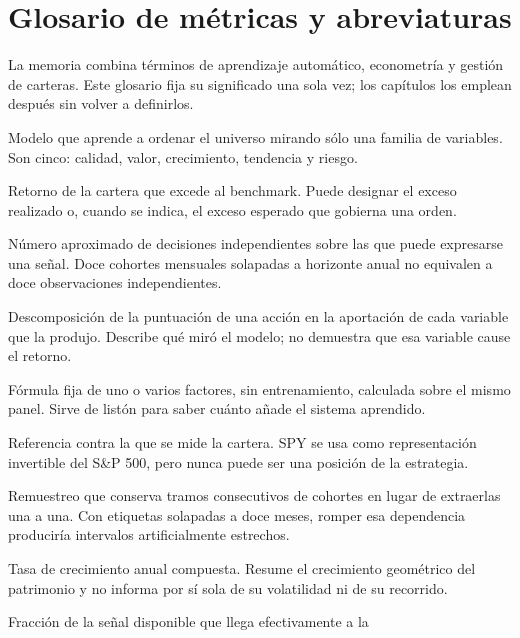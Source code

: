 \chapter*{Glosario de métricas y abreviaturas}

La memoria combina términos de aprendizaje automático, econometría y gestión de carteras. Este
glosario fija su significado una sola vez; los capítulos los emplean después sin volver a
definirlos.

\begin{description}[leftmargin=3.2cm,style=nextline,itemsep=0.45em]
  \item[Agente especialista] Modelo que aprende a ordenar el universo mirando sólo una familia de
  variables. Son cinco: calidad, valor, crecimiento, tendencia y riesgo.
  \item[Alfa] Retorno de la cartera que excede al benchmark. Puede designar el exceso realizado o,
  cuando se indica, el exceso esperado que gobierna una orden.
  \item[Amplitud] Número aproximado de decisiones independientes sobre las que puede expresarse una
  señal. Doce cohortes mensuales solapadas a horizonte anual no equivalen a doce observaciones
  independientes.
  \item[Atribución local] Descomposición de la puntuación de una acción en la aportación de cada
  variable que la produjo. Describe qué miró el modelo; no demuestra que esa variable cause el
  retorno.
  \item[Baseline determinista] Fórmula fija de uno o varios factores, sin entrenamiento, calculada
  sobre el mismo panel. Sirve de listón para saber cuánto añade el sistema aprendido.
  \item[Benchmark] Referencia contra la que se mide la cartera. SPY se usa como representación
  invertible del S\&P 500, pero nunca puede ser una posición de la estrategia.
  \item[Bootstrap por bloques] Remuestreo que conserva tramos consecutivos de cohortes en lugar de
  extraerlas una a una. Con etiquetas solapadas a doce meses, romper esa dependencia produciría
  intervalos artificialmente estrechos.
  \item[CAGR] Tasa de crecimiento anual compuesta. Resume el crecimiento geométrico del patrimonio
  y no informa por sí sola de su volatilidad ni de su recorrido.
  \item[Coeficiente de transferencia] Fracción de la señal disponible que llega efectivamente a la

\end{description}
